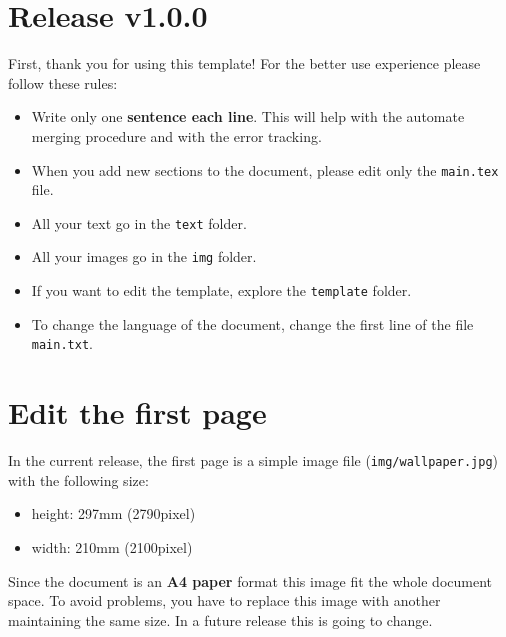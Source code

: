 
\section*{Release v1.0.0}

First, thank you for using this template!
For the better use experience please follow these rules:

\begin{itemize}

	\item Write only one \textbf{sentence each line}.
	This will help with the automate merging procedure and with the error tracking.
	\item When you add new sections to the document, please edit only the \texttt{main.tex} file.
	\item All your text go in the \texttt{text} folder.
	\item All your images go in the \texttt{img} folder.
	\item If you want to edit the template, explore the \texttt{template} folder.
	\item To change the language of the document, change the first line of the file \texttt{main.txt}.

\end{itemize}

\section*{Edit the first page}

In the current release, the first page is a simple image file (\texttt{img/wallpaper.jpg}) with the following size:
\begin{itemize}
	\item height: 297mm (2790pixel)
	\item width: 210mm (2100pixel)
\end{itemize}
Since the document is an \textbf{A4 paper} format this image fit the whole document space.
To avoid problems, you have to replace this image with another maintaining the same size.
In a future release this is going to change.
